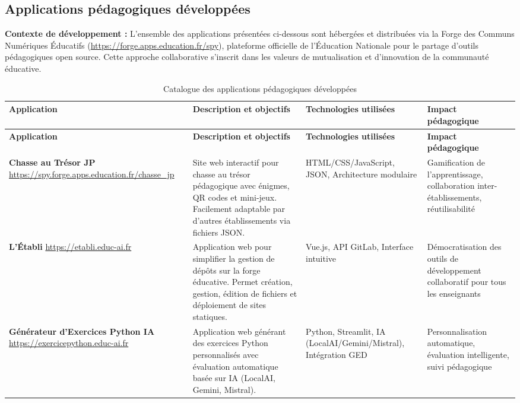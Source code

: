 \subsection{Applications pédagogiques développées}

\textbf{Contexte de développement :} L'ensemble des applications présentées ci-dessous sont hébergées et distribuées via la Forge des Communs Numériques Éducatifs (\url{https://forge.apps.education.fr/spy}), plateforme officielle de l'Éducation Nationale pour le partage d'outils pédagogiques open source. Cette approche collaborative s'inscrit dans les valeurs de mutualisation et d'innovation de la communauté éducative.

\begin{longtable}{|p{3cm}|p{4cm}|p{4cm}|p{3cm}|}
\caption{Catalogue des applications pédagogiques développées} \\
\hline
\textbf{Application} & \textbf{Description et objectifs} & \textbf{Technologies utilisées} & \textbf{Impact pédagogique} \\
\hline
\endfirsthead
\hline
\textbf{Application} & \textbf{Description et objectifs} & \textbf{Technologies utilisées} & \textbf{Impact pédagogique} \\
\hline
\endhead

\textbf{Chasse au Trésor JP} \newline
\url{https://spy.forge.apps.education.fr/chasse_jp} & 
Site web interactif pour chasse au trésor pédagogique avec énigmes, QR codes et mini-jeux. Facilement adaptable par d'autres établissements via fichiers JSON. & 
HTML/CSS/JavaScript, JSON, Architecture modulaire & 
Gamification de l'apprentissage, collaboration inter-établissements, réutilisabilité \\
\hline

\textbf{L'Établi} \newline
\url{https://etabli.educ-ai.fr} & 
Application web pour simplifier la gestion de dépôts sur la forge éducative. Permet création, gestion, édition de fichiers et déploiement de sites statiques. & 
Vue.js, API GitLab, Interface intuitive & 
Démocratisation des outils de développement collaboratif pour tous les enseignants \\
\hline

\textbf{Générateur d'Exercices Python IA} \newline
\url{https://exercicepython.educ-ai.fr} & 
Application web générant des exercices Python personnalisés avec évaluation automatique basée sur IA (LocalAI, Gemini, Mistral). & 
Python, Streamlit, IA (LocalAI/Gemini/Mistral), Intégration GED & 
Personnalisation automatique, évaluation intelligente, suivi pédagogique \\
\hline


\end{longtable}
